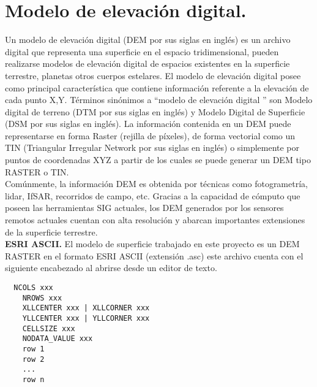 \section{Modelo de elevaci\'{o}n digital.}


Un modelo de elevaci\'{o}n digital (DEM por sus siglas en ingl\'{e}s) es un archivo digital que
representa una superficie en el espacio tridimensional, pueden realizarse modelos de
elevaci\'{o}n digital de espacios existentes en la superficie terrestre, planetas otros cuerpos
estelares.
El modelo de elevaci\'{o}n digital posee como principal caracter\'{i}stica que contiene informaci\'{o}n
referente a la elevaci\'{o}n de cada punto X,Y.
T\'{e}rminos sin\'{o}nimos a  ``modelo de elevaci\'{o}n digital '' son Modelo digital de terreno (DTM por
sus siglas en ingl\'{e}s) y Modelo Digital de Superficie (DSM por sus siglas en ingl\'{e}s).
La informaci\'{o}n contenida en un DEM puede representarse en forma Raster (rejilla de
píxeles), de forma vectorial como un TIN (Triangular Irregular Network por sus siglas en
ingl\'{e}s) o simplemente por puntos de coordenadas XYZ a partir de los cuales se puede
generar un DEM tipo RASTER o TIN.\\
Com\'{u}nmente, la informaci\'{o}n DEM es obtenida por técnicas como fotogrametr\'{i}a, lidar,
IfSAR, recorridos de campo, etc. Gracias a la capacidad de c\'{o}mputo que poseen las
herramientas SIG actuales, los DEM generados por los sensores remotos actuales cuentan
con alta resoluci\'{o}n y abarcan importantes extensiones de la superficie terrestre.
\\
\textbf{ESRI ASCII.}
El modelo de superficie trabajado en este proyecto es un DEM RASTER en el formato ESRI
ASCII (extensi\'{o}n .asc) este archivo cuenta con el siguiente encabezado al abrirse desde un
editor de texto.

\begin{lstlisting}
  NCOLS xxx
    NROWS xxx
    XLLCENTER xxx | XLLCORNER xxx
    YLLCENTER xxx | YLLCORNER xxx
    CELLSIZE xxx
    NODATA_VALUE xxx
    row 1
    row 2
    ...
    row n
\end{lstlisting}

